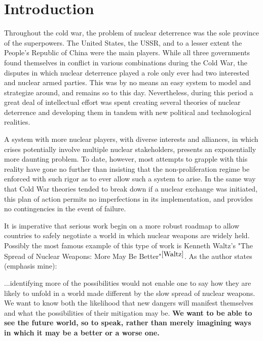 \documentclass[journal]{IEEEtran}
\begin{document}
\section{Introduction}
Throughout the cold war, the problem of nuclear deterrence was the sole province of the superpowers.  The United States, the USSR, and to a lesser extent the People's Republic of China were the main players.  While all three governments found themselves in conflict in various combinations during the Cold War, the disputes in which nuclear deterrence played a role only ever had two interested and nuclear armed parties.  This was by no means an easy system to model and strategize around, and remains so to this day.  Nevertheless, during this period a great deal of intellectual effort was spent creating several theories of nuclear deterrence and developing them in tandem with new political and technological realities.\par
A system with more nuclear players, with diverse interests and alliances, in which crises potentially involve multiple nuclear stakeholders, presents an exponentially more daunting problem.  To date, however, most attempts to grapple with this reality have gone no further than insisting that the non-proliferation regime be enforced with such rigor as to ever allow such a system to arise.  In the same way that Cold War theories tended to break down if a nuclear exchange was  initiated, this plan of action permits no imperfections in its implementation, and provides no contingencies in the event of failure.\par
It is imperative that serious work begin on a more robust roadmap to allow countries to safely negotiate a world in which nuclear weapons are widely held. Possibly the most famous example of this type of work is Kenneth Waltz's "The Spread of Nuclear Weapons: More May Be Better"$^{\cite{Waltz}}$.  As the author states (emphasis mine):\\
\begin{adjustwidth}{10mm}{10mm}
...identifying more of the possibilities would not enable one to say how they are likely to unfold in a world made different by the slow spread of nuclear weapons. We want to know both the likelihood that new dangers will manifest themselves and what the possibilities of their mitigation may be. \textbf{We want to be able to see the future world, so to speak, rather than merely imagining ways in which it may be a better or a worse one.}\\
\end{adjustwidth}
\end{document}
